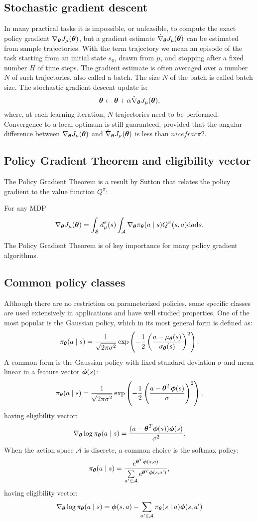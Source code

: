 \subsection{Stochastic gradient descent}
In many practical tasks it is impossible, or unfeasible, to compute the exact policy gradient $\nabla_{\boldsymbol{\theta}}J_\mu(\boldsymbol{\theta})$, but a gradient estimate $\hat{\nabla}_{\boldsymbol{\theta}}J_{\mu}(\boldsymbol{\theta})$ can be estimated from sample trajectories. With the term trajectory we mean an episode of the task starting from an initial state $s_0$, drawn from $\mu$, and stopping after a fixed number $H$ of time steps. The gradient estimate is often averaged over a number $N$ of such trajectories, also called a batch. The size $N$ of the batch is called batch size. The stochastic gradient descent update is:
\[
	\boldsymbol{\theta} \gets \boldsymbol{\theta} + \alpha\hat{\nabla}_{\boldsymbol{\theta}}J_{\mu}(\boldsymbol{\theta}),
\]
where, at each learning iteration, $N$ trajectories need to be performed.
Convergence to a local optimum is still guaranteed, provided that the angular difference between $\nabla_{\boldsymbol{\theta}}J_\mu(\boldsymbol{\theta})$ and $\hat{\nabla}_{\boldsymbol{\theta}}J_{\mu}(\boldsymbol{\theta})$ is less than $nicefrac{\pi}{2}$.

\subsection{Policy Gradient Theorem and eligibility vector}
The Policy Gradient Theorem is a result by Sutton \cite{Sutton1999a} that relates the policy gradient to the value function $Q^\pi$:
\begin{theorem}\label{theo:pgt}
For any \ac{MDP}
\[
	\nabla_{\boldsymbol{\theta}}J_\mu(\boldsymbol{\theta}) = \int_{\mathcal{S}}d_{\mu}^{\pi}(s)
		\int_{\mathcal{A}} \nabla_{\boldsymbol{\theta}}\pi_{\boldsymbol{\theta}}(a \mid s)Q^{\pi}(s,a)\mathrm{d}a\mathrm{d}s.
\]
\end{theorem}
The Policy Gradient Theorem is of key importance for many policy gradient algorithms.

\subsection{Common policy classes}
Although there are no restriction on parameterized policies, some specific classes are used extensively in applications and have well studied properties. One of the most popular is the Gaussian policy, which in its most general form is defined as:
\[
	\pi_{\boldsymbol{\theta}}(a \mid s) = \frac{1}{\sqrt{2\pi\sigma^2}}
		\exp\left(-\frac{1}{2}\left(\frac{a-\mu_{\boldsymbol{\theta}}(s)}
		{\sigma_{\boldsymbol{\theta}}(s)}\right)^2\right).
\]
A common form is the Gaussian policy with fixed standard deviation $\sigma$ and mean linear in a feature vector $\boldsymbol{\phi}(s)$:
\[
	\pi_{\boldsymbol{\theta}}(a \mid s) = \frac{1}{\sqrt{2\pi\sigma^2}}\exp\left(
		-\frac{1}{2}\left(\frac{a-\boldsymbol{\theta}^T\boldsymbol{\phi}(s)}{\sigma}\right)^2\right),
\]
having eligibility vector:
\[
	\nabla_{\boldsymbol{\theta}}\log\pi_{\boldsymbol{\theta}}(a \mid s) = \frac{(a - \boldsymbol{\theta}^T\boldsymbol{\phi}(s))\boldsymbol{\phi}(s)}{\sigma^2}.
\]
When the action space $\mathcal{A}$ is discrete, a common choice is the softmax policy:
\[
	\pi_{\boldsymbol{\theta}}(a \mid s) = \frac{e^{\boldsymbol{\theta}^T\boldsymbol{\phi}(s,a)}}
		{\sum\limits_{a' \in \mathcal{A}}e^{\boldsymbol{\theta}^T\boldsymbol{\phi}(s,a')}},
\]
having eligibility vector:
\[
	\nabla_{\boldsymbol{\theta}}\log\pi_{\boldsymbol{\theta}}(a \mid s) = \boldsymbol{\phi}(s,a) - \sum\limits_{a' \in \mathcal{A}}\pi_{\boldsymbol{\theta}}(s \mid a)\boldsymbol{\phi}(s,a')
\]
